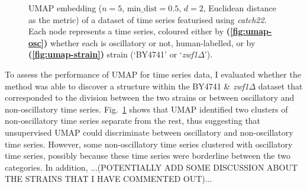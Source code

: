 \begin{figure}
  \caption[
      UMAP embedding of a dataset of time series featurised using \textit{catch22}.
    ]{
      UMAP embedding ($n=5$, $\mathrm{min\_dist} = 0.5$, $d=2$, Euclidean distance as the metric) of a dataset of time series featurised using \textit{catch22}.
      Each node represents a time series, coloured either by
      \textbf{(\ref{fig:umap-osc})}
      whether each is oscillatory or not, human-labelled, or by
      \textbf{(\ref{fig:umap-strain})}
      strain (`BY4741' or `\textit{zwf1$\Delta$}').
    }
  \label{fig:umap}
\end{figure}

To assess the performance of UMAP for time series data, I evaluated whether the method was able to discover a structure within the BY4741 \& \textit{zwf1$\Delta$} dataset that corresponded to the division between the two strains or between oscillatory and non-oscillatory time series.
Fig.\ \ref{fig:umap} shows that UMAP identified two clusters of non-oscillatory time series separate from the rest, thus suggesting that unsupervised UMAP could discriminate between oscillatory and non-oscillatory time series.
However, some non-oscillatory time series clustered with oscillatory time series, possibly because these time series were borderline between the two categories.
In addition, ...(POTENTIALLY ADD SOME DISCUSSION ABOUT THE STRAINS THAT I HAVE COMMENTED OUT)...


